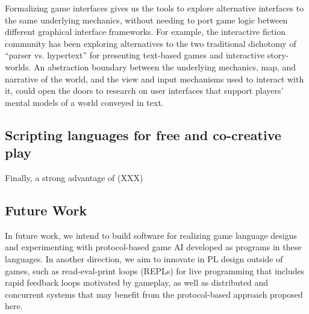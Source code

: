 Formalizing game interfaces gives us the tools to explore alternative
interfaces to the same underlying mechanics, without needing to port
game logic between different graphical interface frameworks. For example,
the interactive fiction community has been exploring alternatives to the
two traditional dichotomy of ``parser vs. hypertext'' for presenting
text-based games and interactive story-worlds. An abstraction boundary
between the underlying mechanics, map, and narrative of the world, and the
view and input mechanisms used to interact with it, could open the doors to
research on user interfaces that support players' mental models of a world
conveyed in text.

\subsection{Scripting languages for free and co-creative play}

Finally, a strong advantage of (XXX)


\subsection{Future Work}
  In future work, we intend to build software for realizing game language
  designs and experimenting with protocol-based game AI developed as
  programs in these languages. In another direction, we aim to innovate in
  PL design outside of games, such as read-eval-print loops (REPLs) for
  live programming that includes rapid feedback loops motivated by
  gameplay, as well as distributed and concurrent systems that may benefit
  from the protocol-based approach proposed here.


